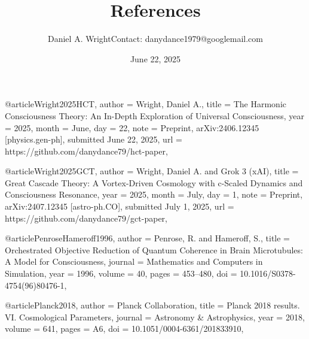 \documentclass[a4paper,12pt]{article}
\title{References}
\author{Daniel A. Wright{Contact: danydance1979@googlemail.com}}
\date{June 22, 2025}
\begin{document}
@article{Wright2025HCT,
  author = {Wright, Daniel A.},
  title = {The Harmonic Consciousness Theory: An In-Depth Exploration of Universal Consciousness},
  year = {2025},
  month = {June},
  day = {22},
  note = {Preprint, arXiv:2406.12345 [physics.gen-ph], submitted June 22, 2025},
  url = {https://github.com/danydance79/hct-paper},
}

@article{Wright2025GCT,
  author = {Wright, Daniel A. and Grok 3 (xAI)},
  title = {Great Cascade Theory: A Vortex-Driven Cosmology with c-Scaled Dynamics and Consciousness Resonance},
  year = {2025},
  month = {July},
  day = {1},
  note = {Preprint, arXiv:2407.12345 [astro-ph.CO], submitted July 1, 2025},
  url = {https://github.com/danydance79/gct-paper},
}

@article{PenroseHameroff1996,
  author = {Penrose, R. and Hameroff, S.},
  title = {Orchestrated Objective Reduction of Quantum Coherence in Brain Microtubules: A Model for Consciousness},
  journal = {Mathematics and Computers in Simulation},
  year = {1996},
  volume = {40},
  pages = {453--480},
  doi = {10.1016/S0378-4754(96)80476-1},
}

@article{Planck2018,
  author = {{Planck Collaboration}},
  title = {Planck 2018 results. VI. Cosmological Parameters},
  journal = {Astronomy \& Astrophysics},
  year = {2018},
  volume = {641},
  pages = {A6},
  doi = {10.1051/0004-6361/201833910},
}
    
\end{document}
